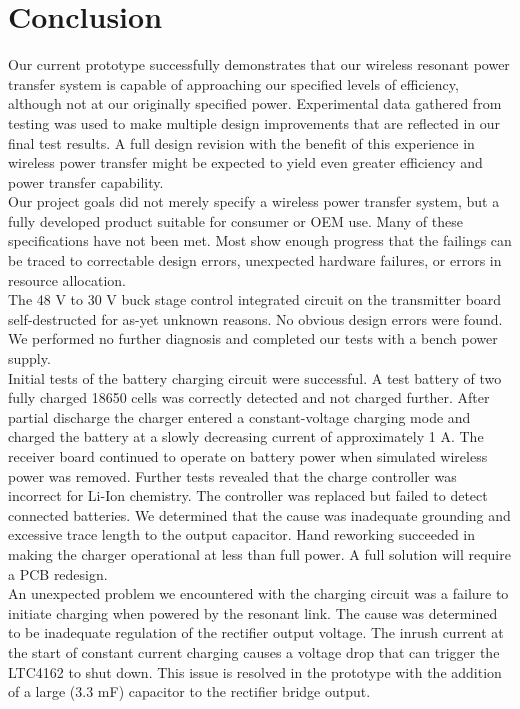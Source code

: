 \documentclass[12pt]{article}
\begin{document}
\pagebreak

\section{Conclusion}

\indent \indent
Our current prototype successfully demonstrates that our wireless resonant power transfer system is capable of approaching our specified levels of efficiency, although not at our originally specified power. Experimental data gathered from testing was used to make multiple design improvements that are reflected in our final test results. A full design revision with the benefit of this experience in wireless power transfer might be expected to yield even greater efficiency and power transfer capability.\\

\indent
Our project goals did not merely specify a wireless power transfer system, but a fully developed product suitable for consumer or OEM use. Many of these specifications have not been met. Most show enough progress that the failings can be traced to correctable design errors, unexpected hardware failures, or errors in resource allocation.\\

\indent
The 48 V to 30 V buck stage control integrated circuit on the transmitter board self-destructed for as-yet unknown reasons. No obvious design errors were found. We performed no further diagnosis and completed our tests with a bench power supply.\\

\indent
Initial tests of the battery charging circuit were successful. A test battery of two fully charged 18650 cells was correctly detected and not charged further. After partial discharge the charger entered a constant-voltage charging mode and charged the battery at a slowly decreasing current of approximately 1 A. The receiver board continued to operate on battery power when simulated wireless power was removed. Further tests revealed that the charge controller was incorrect for Li-Ion chemistry. The controller was replaced but failed to detect connected batteries. We determined that the cause was inadequate grounding and excessive trace length to the output capacitor. Hand reworking succeeded in making the charger operational at less than full power. A full solution will require a PCB redesign.\\

\indent
An unexpected problem we encountered with the charging circuit was a failure to initiate charging when powered by the resonant link. The cause was determined to be inadequate regulation of the rectifier output voltage. The inrush current at the start of constant current charging causes a voltage drop that can trigger the LTC4162 to shut down. This issue is resolved in the prototype with the addition of a large (3.3 mF) capacitor to the rectifier bridge output.\\
\end{document}
